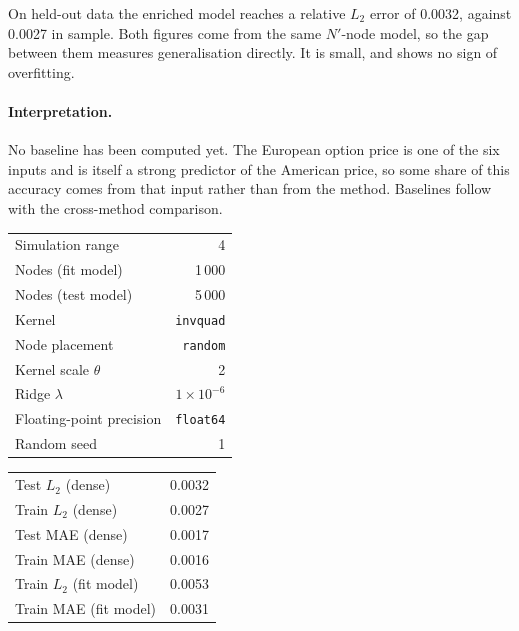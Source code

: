 \documentclass[11pt,a4paper]{article}
\begin{document}
On held-out data the enriched model reaches a relative $L_2$ error of 0.0032, against 0.0027 in sample. Both figures come from the same $N'$-node model, so the gap between them measures generalisation directly. It is small, and shows no sign of overfitting.

\paragraph{Interpretation.} No baseline has been computed yet. The European
option price is one of the six inputs and is itself a strong predictor of the
American price, so some share of this accuracy comes from that input rather than
from the method. Baselines follow with the cross-method comparison.

\begin{center}
\begin{minipage}{\linewidth}\centering
  \begin{minipage}[t]{0.48\linewidth}\vspace{0pt}\centering
    \begin{tabular}{lr}
      \toprule
      Simulation range & 4 \\
      Nodes (fit model) & 1\,000 \\
      Nodes (test model) & 5\,000 \\
      Kernel & \texttt{invquad} \\
      Node placement & \texttt{random} \\
      Kernel scale $\theta$ & 2 \\
      Ridge $\lambda$ & $1\times10^{-6}$ \\
      Floating-point precision & \texttt{float64} \\
      Random seed & 1 \\
      \bottomrule
    \end{tabular}
  \end{minipage}\hfill
  \begin{minipage}[t]{0.48\linewidth}\vspace{0pt}\centering
    \begin{tabular}{lr}
      \toprule
      Test $L_2$ (dense) & 0.0032 \\
      Train $L_2$ (dense) & 0.0027 \\
      Test MAE (dense) & 0.0017 \\
      Train MAE (dense) & 0.0016 \\
      Train $L_2$ (fit model) & 0.0053 \\
      Train MAE (fit model) & 0.0031 \\
      \bottomrule
    \end{tabular}
  \end{minipage}
  \label{tab:onedim_gss}
\end{minipage}
\end{center}
\end{document}
